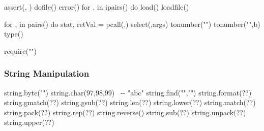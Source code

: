 \documentclass{refcard}
\newcommand{\F}{\I{f}}
\begin{document}
\begin{ldesc}
	  assert(, )
	      dofile()
	        error()
	   for , in ipairs() do
	  load()
	         loadfile()

	     for , in pairs() do
	       stat, retVal = pcall(\F,)
	  select(,args)
	              tonumber("")
	       tonumber("",b)
	              type()

		require("")
\end{ldesc}

\subsubsection{String Manipulation}

\begin{ldesc}
	   string.byte("")
	     string.char(97,98,99) ~-{-} "abc"
	         string.find("","")
	\li[??]                                string.format(??)
	\li[??]                                string.gmatch(??)
	\li[??]                                string.gsub(??)
	\li[??]                                string.len(??)
	\li[??]                                string.lower(??)
	\li[??]                                string.match(??)
	\li[??]                                string.pack(??)
	\li[??]                                string.rep(??)
	       string.reverse()
	\li[??]                                string.sub(??)
	\li[??]                                string.unpack(??)
	\li[??]                                string.upper(??)
\end{ldesc}
\end{document}
